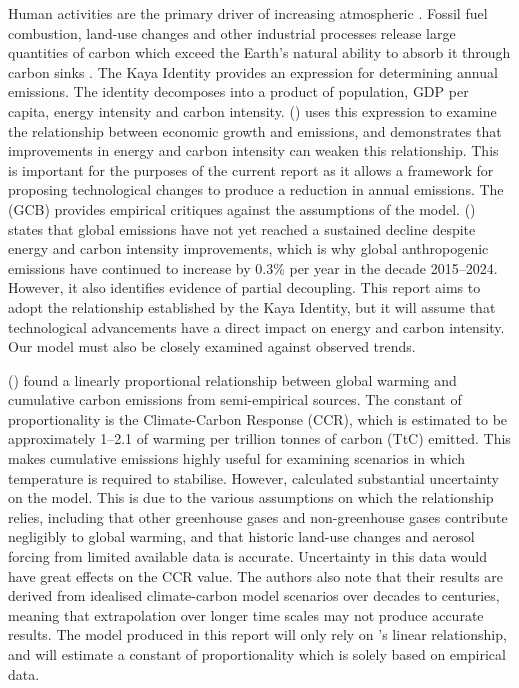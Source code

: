 \documentclass[12pt]{article}
\newcommand{\cotwo}{\text{CO\textsubscript{2}}}
\renewcommand{\textcite}[1]{\citeauthor{#1} (\citeyear{#1})}
\begin{document}
Human activities are the primary driver of increasing atmospheric \cotwo{} \cite{ipcc_2023}.
Fossil fuel combustion, land-use changes and other industrial processes release large quantities of carbon
which exceed the Earth's natural ability to absorb it through carbon sinks \cite{gcb_2025}.
The Kaya Identity provides an expression for determining annual \cotwo{} emissions.
The identity decomposes \cotwo{} into a product of population, GDP per capita, energy intensity and carbon intensity.
\textcite{deutch_2017}\supercite{deutch_2017} uses this expression to examine the relationship between economic growth and emissions,
and demonstrates that improvements in energy and carbon intensity can weaken this relationship.
This is important for the purposes of the current report as it allows a framework for proposing technological changes
to produce a reduction in annual emissions.
The  (GCB) provides empirical critiques against the assumptions of the model.
\textcite{gcb_2025} states that global emissions have not yet reached a sustained decline despite energy and carbon intensity improvements,
which is why global anthropogenic \cotwo{} emissions have continued to increase by 0.3\% per year in the decade 2015--2024.
However, it also identifies evidence of partial decoupling.
This report aims to adopt the relationship established by the Kaya Identity,
but it will assume that technological advancements have a direct impact on energy and carbon intensity.
Our model must also be closely examined against observed trends.

\textcite{matthews_2009}\supercite{matthews_2009} found a linearly proportional relationship
between global warming and cumulative carbon emissions from semi-empirical sources.
The constant of proportionality is the Climate-Carbon Response (CCR), which is estimated to be approximately 1--2.1
of warming per trillion tonnes of carbon (TtC) emitted.
This makes cumulative emissions highly useful for examining scenarios in which temperature is required to stabilise.
However, \citeauthor{matthews_2009} calculated substantial uncertainty on the model.
This is due to the various assumptions on which the relationship relies,
including that other greenhouse gases and non-greenhouse gases contribute negligibly to global warming,
and that historic land-use changes and aerosol forcing from limited available data is accurate.
Uncertainty in this data would have great effects on the CCR value.
The authors also note that their results are derived from idealised climate-carbon model scenarios over decades to centuries,
meaning that extrapolation over longer time scales may not produce accurate results.
The model produced in this report will only rely on \citeauthor{matthews_2009}'s linear relationship,
and will estimate a constant of proportionality which is solely based on empirical data.
\end{document}
